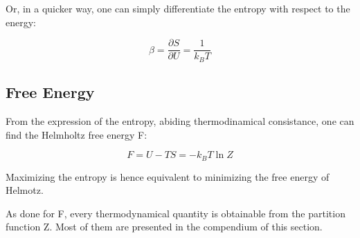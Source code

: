 \documentclass{article}
\begin{document}
Or, in a quicker way, one can simply differentiate the entropy with respect to the energy:

\begin{equation}
    \beta=\frac{\partial S}{\partial U}= \frac{1}{k_BT}
\end{equation}

\subsection{Free Energy}
From the expression of the entropy, abiding thermodinamical consistance, one can find the Helmholtz free energy F:

\begin{equation}
    F=U-TS=-k_BT\ln{Z}
\end{equation}

Maximizing the entropy is hence equivalent to minimizing the free energy of Helmotz.

As done for F, every thermodynamical quantity is obtainable from the partition function Z.
Most of them are presented in the compendium of this section.

\newpage
\end{document}

